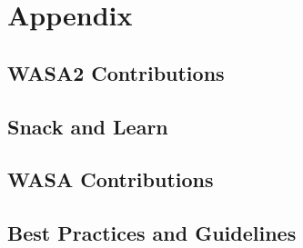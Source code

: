 \chapter{Appendix}

\section{WASA2 Contributions}


\section{Snack and Learn}


\section{WASA Contributions}


\section{Best Practices and Guidelines}






\clearpage


%
%
\makeatletter
\renewenvironment{thebibliography}[1]
     {\section{\bibname}
      \list{\@biblabel{\@arabic\c@enumiv}}
           {\settowidth\labelwidth{\@biblabel{#1}}
            \leftmargin\labelwidth
            \advance\leftmargin\labelsep
            \@openbib@code
            \usecounter{enumiv}%
            \let\p@enumiv\@empty
            \renewcommand\theenumiv{\@arabic\c@enumiv}}
      \sloppy
      \clubpenalty4000
      \@clubpenalty \clubpenalty
      \widowpenalty4000
      \sfcode`\.\@m}
     {\def\@noitemerr
       {\@latex@warning{Empty `thebibliography' environment}}%
      \endlist}
\makeatother

